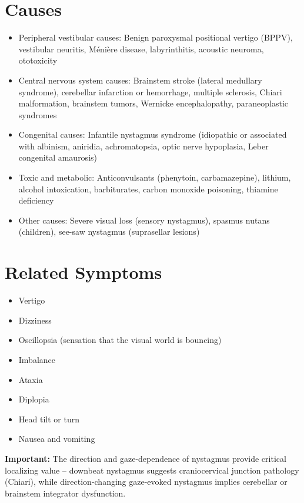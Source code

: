 \section*{Causes}
\begin{itemize}
  \item Peripheral vestibular causes: Benign paroxysmal positional vertigo (BPPV), vestibular neuritis, M\'eni\`ere disease, labyrinthitis, acoustic neuroma, ototoxicity
  \item Central nervous system causes: Brainstem stroke (lateral medullary syndrome), cerebellar infarction or hemorrhage, multiple sclerosis, Chiari malformation, brainstem tumors, Wernicke encephalopathy, paraneoplastic syndromes
  \item Congenital causes: Infantile nystagmus syndrome (idiopathic or associated with albinism, aniridia, achromatopsia, optic nerve hypoplasia, Leber congenital amaurosis)
  \item Toxic and metabolic: Anticonvulsants (phenytoin, carbamazepine), lithium, alcohol intoxication, barbiturates, carbon monoxide poisoning, thiamine deficiency
  \item Other causes: Severe visual loss (sensory nystagmus), spasmus nutans (children), see-saw nystagmus (suprasellar lesions)
\end{itemize}

\section*{Related Symptoms}
\begin{itemize}
  \item Vertigo
  \item Dizziness
  \item Oscillopsia (sensation that the visual world is bouncing)
  \item Imbalance
  \item Ataxia
  \item Diplopia
  \item Head tilt or turn
  \item Nausea and vomiting
\end{itemize}
\textbf{Important:} The direction and gaze-dependence of nystagmus provide critical localizing value -- downbeat nystagmus suggests craniocervical junction pathology (Chiari), while direction-changing gaze-evoked nystagmus implies cerebellar or brainstem integrator dysfunction.

